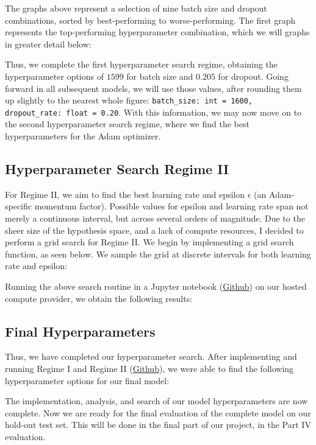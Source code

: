 

\noindent
The graphs above represent a selection of nine batch size and dropout combinations, sorted by best-performing to worse-performing. The first graph represents the top-performing hyperparameter combination, which we will graphs in greater detail below:



\noindent
Thus, we complete the first hyperparameter search regime, obtaining the hyperparameter options of \(1599\) for batch size and \(0.205\) for dropout. Going forward in all subsequent models, we will use those values, after rounding them up slightly to the nearest whole figure: \texttt{batch_size: int = 1600, dropout_rate: float = 0.20}. With this information, we may now move on to the second hyperparameter search regime, where we find the best hyperparameters for the Adam optimizer.

\subsection{Hyperparameter Search Regime II}

For Regime II, we aim to find the best learning rate and epsilon \(\epsilon\) (an Adam-specific momentum factor). Possible values for epsilon and learning rate span not merely a continuous interval, but across several orders of magnitude. Due to the sheer size of the hypothesis space, and a lack of compute resources, I decided to perform a grid search for Regime II. We begin by implementing a grid search function, as seen below. We sample the grid at discrete intervals for both learning rate and epsilon:



\noindent
Running the above search routine in a Jupyter notebook (\href{https://github.com/ShenZhouHong/radiography-ai-project/blob/13893a1c14cbfdd78876fda2a45aa765377d7cfc/python/hyperparam-search/regime-2.ipynb}{Github}) on our hosted compute provider, we obtain the following results:





\subsection{Final Hyperparameters}

Thus, we have completed our hyperparameter search. After implementing and running Regime I and Regime II (\href{https://github.com/ShenZhouHong/radiography-ai-project/tree/13893a1c14cbfdd78876fda2a45aa765377d7cfc/python/hyperparam-search}{Github}), we were able to find the following hyperparameter options for our final model:



\noindent
The implementation, analysis, and search of our model hyperparameters are now complete. Now we are ready for the final evaluation of the complete model on our hold-out test set. This will be done in the final part of our project, in the Part IV evaluation.